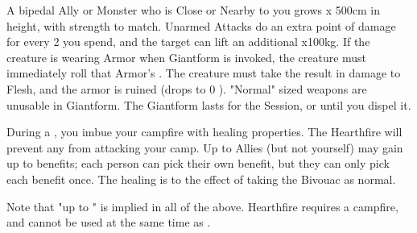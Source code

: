 \begin{multicols*}{2}
\LITURGY [
  Name = Giantform,
  Link = arcana-mystery-giantform,
  Paradigm = J{\UmlautO}tnar,
  Duration = Session
]

A bipedal Ally or Monster who is Close or Nearby to you grows \DICE x 500cm in height, with strength to match. Unarmed Attacks do an extra point of damage for every 2 \DICE you spend, and the target can lift an additional \DICE x100kg. If the creature is wearing Armor when Giantform is invoked, the creature must immediately roll that Armor's \UD. The creature must take the result in damage to Flesh, and the armor is ruined (drops to 0 \MAX \UD).  "Normal" sized weapons are unusable in Giantform. The Giantform lasts for the Session, or until you dispel it.

\LITURGY [
  Name = Hearthfire,
  Link = arcana-mystery-hearthfire,
  Paradigm = Heathen,
  Duration = Bivouac
]

During a , you imbue your campfire with healing properties. The Hearthfire will prevent any  from attacking your camp. Up to \DICE Allies (but not yourself) may gain up to \DICE benefits; each person can pick their own benefit, but they can only pick each benefit once.  The healing is  to the effect of taking the Bivouac as normal.


Note that "up to \MAX" is implied in all of the above. Hearthfire requires a campfire, and cannot be used at the same time as .


\end{multicols*}
